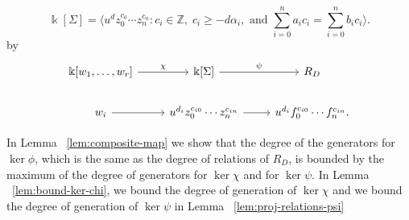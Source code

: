 \documentclass{amsart}
\theoremstyle{plain}
\theoremstyle{definition}
\theoremstyle{remark}
\numberwithin{equation}{section}
\newcommand\bz{{\mathbb Z}}
\newcommand\bk{{\Bbbk}}
\newcommand\bida{a}
\newcommand\bidb{b}
\begin{document}
\[
	\bk[\Sigma] =  \langle u^d z_0^{c_0} \cdots z_n^{c_n} \colon c_i \in
\bz, \; c_i \geq -d \alpha_i, \mbox{ and }\sum_{i=0}^{n} \bida_i c_i =
\sum_{i=0}^{n} \bidb_i c_i \rangle. 
\]
by
\begin{equation}
\label{eqn:factor-through-semigroup-ring}
\begin{tikzcd}[baseline=(current  bounding  box.center)]
\bk[w_1,\ldots, w_r] \ar {r}{\chi} & \bk[\Sigma] \ar {r}{\psi} & R_D \\
w_i \ar r & u^{d_i}z_0^{c_{i0}} \cdots z_n^{c_{in}} \ar r & u^{d_i}f_0^{c_{i0}} \cdots f_n^{c_{in}}.
\end{tikzcd}
\end{equation}

In Lemma ~\ref{lem:composite-map} we show that the degree of the
generators for $\ker \phi$, which is the same as the degree of relations
of $R_D$, is bounded by the maximum of the degree of generators for
$\ker \chi$ and for $\ker \psi$.
In Lemma ~\ref{lem:bound-ker-chi}, we bound the degree of generation of
$\ker \chi $ and we bound the degree of generation of $\ker \psi$ in Lemma ~\ref{lem:proj-relations-psi}
\end{document}
